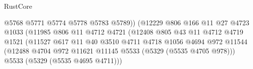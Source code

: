 \begin{lexlean}{RustCore}
\begin{coremodule}
                                                  @5768
                                                  @5771
                                                  @5774
                                                  @5778
                                                  @5783
                                                  @5789))
                                              (@12229
                                                @806
                                                @166
                                                @11
                                                @27
                                                @4723
                                                @1033
                                                (@11985
                                                  @806
                                                  @11
                                                  @4712
                                                  @4721
                                                  (@12408
                                                    @805
                                                    @43
                                                    @11
                                                    @4712
                                                    @4719
                                                    @1521
                                                    (@11527
                                                      @617
                                                      @11
                                                      @40
                                                      @3510
                                                      @4711
                                                      @4718
                                                      @1056
                                                      @4694
                                                      @972
                                                      @11544
                                                      (@12488
                                                        @4704
                                                        @972
                                                        @11621
                                                        @11145
                                                        @5533
                                                        (@5329 (@5535 @4705 @978)))
                                                      @5533
                                                      (@5329 (@5535 @4695 @4711)))

\end{coremodule}
\end{lexlean}
